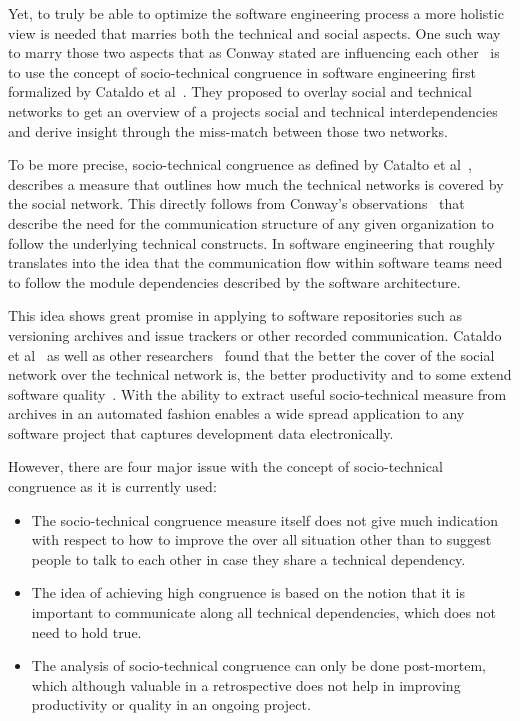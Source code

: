 Yet, to truly be able to optimize the software engineering process a more holistic view is needed that marries both the technical and social aspects.
One such way to marry those two aspects that as Conway stated are influencing each other~\cite{conway:datamination:1968} is to use the concept of socio-technical congruence in software engineering first formalized by Cataldo et al~\cite{cataldo:cscw:2006}.
They proposed to overlay social and technical networks to get an overview of a projects social and technical interdependencies and derive insight through the miss-match between those two networks.

To be more precise, socio-technical congruence as defined by Catalto et al~\cite{cataldo:cscw:2006}, describes a measure that outlines how much the technical networks is covered by the social network.
This directly follows from Conway's observations~\cite{conway:datamination:1968} that describe the need for the communication structure of any given organization to follow the underlying technical constructs.
In software engineering that roughly translates into the idea that the communication flow within software teams need to follow the module dependencies described by the software architecture. 
 
This idea shows great promise in applying to software repositories such as versioning archives and issue trackers or other recorded communication.
Cataldo et al~\cite{cataldo:cscw:2006,cataldo:esem:2008} as well as other researchers~\cite{valetto:msr:2007,ehrlich:stc:2008} found that the better the cover of the social network over the technical network is, the better productivity and to some extend software quality~\cite{kwan:tse:2011,bird:issre:2009,kwan:stc:2009}.
With the ability to extract useful socio-technical measure from archives in an automated fashion enables a wide spread application to any software project that captures development data electronically.

However, there are four major issue with the concept of socio-technical congruence as it is currently used:
\begin{itemize}
\item The socio-technical congruence measure itself does not give much indication with respect to how to improve the over all situation other than to suggest people to talk to each other in case they share a technical dependency. 
\item The idea of achieving high congruence is based on the notion that it is important to communicate along all technical dependencies, which does not need to hold true.
\item The analysis of socio-technical congruence can only be done post-mortem, which although valuable in a retrospective does not help in improving productivity or quality in an ongoing project.
\end{itemize}

